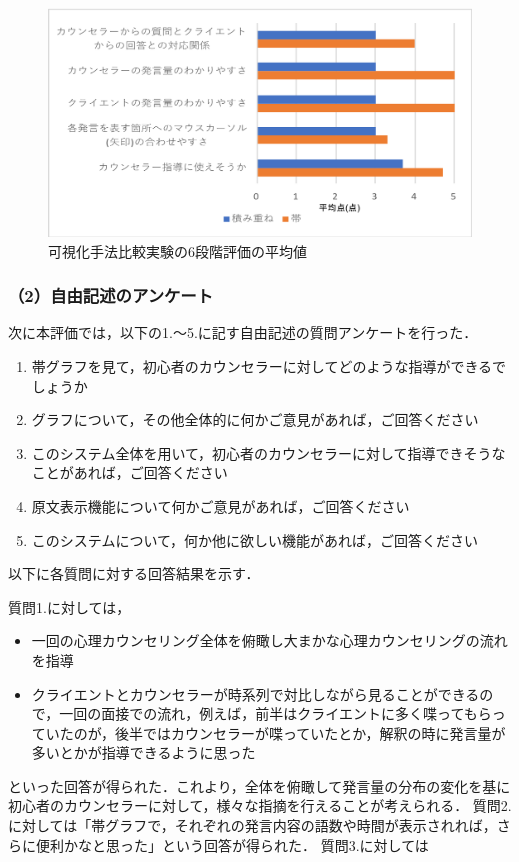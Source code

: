 \documentclass[shuuron]{kuee}
\begin{document}
\begin{figure}
  \begin{center}
    \includegraphics[width=\linewidth]{keijouAnketo.png}
  \end{center}
  \caption{可視化手法比較実験の6段階評価の平均値}
  \label{fig:keijouAnketo}
\end{figure}


\subsubsection{（2）自由記述のアンケート}

次に本評価では，以下の1.〜5.に記す自由記述の質問アンケートを行った．

\begin{enumerate}
  \item 帯グラフを見て，初心者のカウンセラーに対してどのような指導ができるでしょうか
  \item グラフについて，その他全体的に何かご意見があれば，ご回答ください
  \item このシステム全体を用いて，初心者のカウンセラーに対して指導できそうなことがあれば，ご回答ください
  \item 原文表示機能について何かご意見があれば，ご回答ください
  \item このシステムについて，何か他に欲しい機能があれば，ご回答ください
\end{enumerate}

以下に各質問に対する回答結果を示す．

質問1.に対しては，
\begin{itemize}

  \item 一回の心理カウンセリング全体を俯瞰し大まかな心理カウンセリングの流れを指導
  \item クライエントとカウンセラーが時系列で対比しながら見ることができるので，一回の面接での流れ，例えば，前半はクライエントに多く喋ってもらっていたのが，後半ではカウンセラーが喋っていたとか，解釈の時に発言量が多いとかが指導できるように思った
\end{itemize}
といった回答が得られた．これより，全体を俯瞰して発言量の分布の変化を基に初心者のカウンセラーに対して，様々な指摘を行えることが考えられる．
質問2.に対しては「帯グラフで，それぞれの発言内容の語数や時間が表示されれば，さらに便利かなと思った」という回答が得られた．
質問3.に対しては
\end{document}
